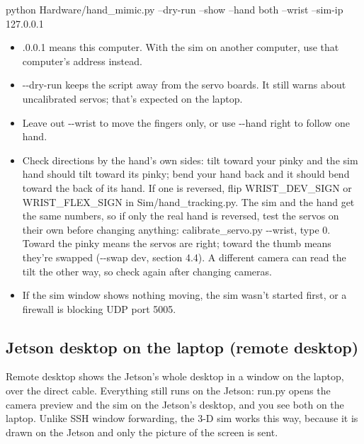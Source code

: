 \documentclass[11pt,letterpaper]{article}
\newcommand{\code}[1]{\textcolor{codeblue}{\ttfamily\smaller\relax #1}}
\begin{document}
\begin{codeblock}
python Hardware/hand_mimic.py --dry-run --show --hand both --wrist --sim-ip 127.0.0.1
\end{codeblock}
\begin{itemize}
  \item \code{127.\allowbreak{}0.\allowbreak{}0.\allowbreak{}1} means this computer. With the sim on another computer, use that computer's address instead.
  \item \code{-{}-{}dry-{}\allowbreak{}run} keeps the script away from the servo boards. It still warns about uncalibrated servos; that's expected on the laptop.
  \item Leave out \code{-{}-{}wrist} to move the fingers only, or use \code{-{}-{}hand right} to follow one hand.
  \item Check directions by the hand's own sides: tilt toward your pinky and the sim hand should tilt toward its pinky; bend your hand back and it should bend toward the back of its hand. If one is reversed, flip \code{WRIST\_\allowbreak{}DEV\_\allowbreak{}SIGN} or \code{WRIST\_\allowbreak{}FLEX\_\allowbreak{}SIGN} in \code{Sim/\allowbreak{}hand\_\allowbreak{}tracking.py}. The sim and the hand get the same numbers, so if only the real hand is reversed, test the servos on their own before changing anything: \code{calibrate\_\allowbreak{}servo.py -{}-{}wrist}, type \code{25 0}. Toward the pinky means the servos are right; toward the thumb means they're swapped (\code{-{}-{}swap dev}, section 4.4). A different camera can read the tilt the other way, so check again after changing cameras.
  \item If the sim window shows nothing moving, the sim wasn't started first, or a firewall is blocking UDP port 5005.
\end{itemize}

\subsection{Jetson desktop on the laptop (remote desktop)}
Remote desktop shows the Jetson's whole desktop in a window on the laptop, over the direct cable. Everything still runs on the Jetson: \code{run.py} opens the camera preview and the sim on the Jetson's desktop, and you see both on the laptop. Unlike SSH window forwarding, the 3-D sim works this way, because it is drawn on the Jetson and only the picture of the screen is sent.
\end{document}
